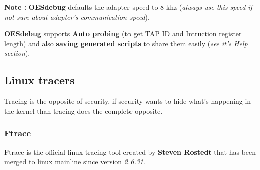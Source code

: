 \begin{enumerate}
\begin{enumerate}
\textbf{\color{orange}Note :} \textbf{OESdebug} defaults the adapter speed to 8 khz (\textit{always use this speed if not sure about adapter's communication speed}). 	 
\begin{center}
\begin{mdframed}[
        linecolor=red,linewidth=2pt,%
        frametitlerule=true,%
        apptotikzsetting={\tikzset{mdfframetitlebackground/.append style={%
            shade,left color=white, right color=blue!20}}}, 
        frametitlerulecolor=blue,
        frametitlerulewidth=1pt, innertopmargin=\topskip,
        frametitle={OESdebug Extra features},
        outerlinewidth=1.25pt
    ]
	\textbf{OESdebug} supports \textbf{Auto probing} (to get TAP ID and Intruction register length) and also \textbf{saving generated scripts}  to share them easily (\textit{see it's Help section}).
\end{mdframed}
\end{center}

	\end{enumerate}
	
	
		
\end{enumerate}
	



\subsection{Linux tracers}
Tracing is the opposite of security, if security wants to hide what's happening in the kernel than tracing does the complete opposite.

\subsubsection{Ftrace}
Ftrace is the official linux tracing tool created by \og \textbf{Steven Rostedt} \fg that has been merged to linux mainline since version \emph{2.6.31}.

